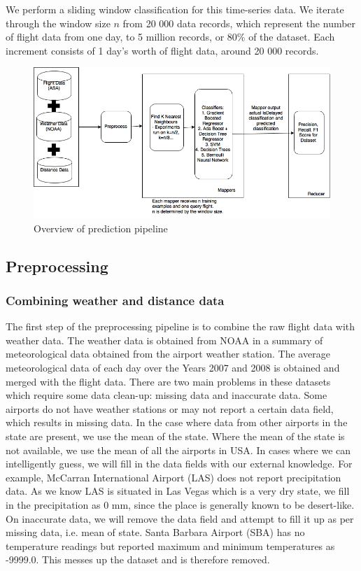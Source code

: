 \documentclass[letterpaper,11pt]{article}
\begin{document}
We perform a sliding window classification for this time-series data. We iterate through the window size $n$ from 20 000 data records, which represent the number of flight data from one day, to 5 million records, or 80\% of the dataset. Each increment consists of 1 day's worth of flight data, around 20 000 records. 

\begin{figure}[htb]
\centering
\includegraphics[width=0.7\linewidth]{CS5228-final.png}
\caption{Overview of prediction pipeline}
\label{fig:overview}
\end{figure}

\subsection{Preprocessing}
\subsubsection{Combining weather and distance data}
The first step of the preprocessing pipeline is to combine the raw flight data with weather data. The weather data is obtained from NOAA in a summary of meteorological data obtained from the airport weather station. The average meteorological data of each day over the Years 2007 and 2008 is obtained and merged with the flight data. There are two main problems in these datasets which require some data clean-up: missing data and inaccurate data. Some airports do not have weather stations or may not report a certain data field, which results in missing data. In the case where data from other airports in the state are present, we use the mean of the state. Where the mean of the state is not available, we use the mean of all the airports in USA. In cases where we can intelligently guess, we will fill in the data fields with our external knowledge. For example, McCarran International Airport (LAS) does not report precipitation data. As we know LAS is situated in Las Vegas which is a very dry state, we fill in the precipitation as 0 mm, since the place is generally known to be desert-like. On inaccurate data, we will remove the data field and attempt to fill it up as per missing data, i.e. mean of state. Santa Barbara Airport (SBA) has no temperature readings but reported maximum and minimum temperatures as -9999.0. This messes up the dataset and is therefore removed. 
\end{document}
